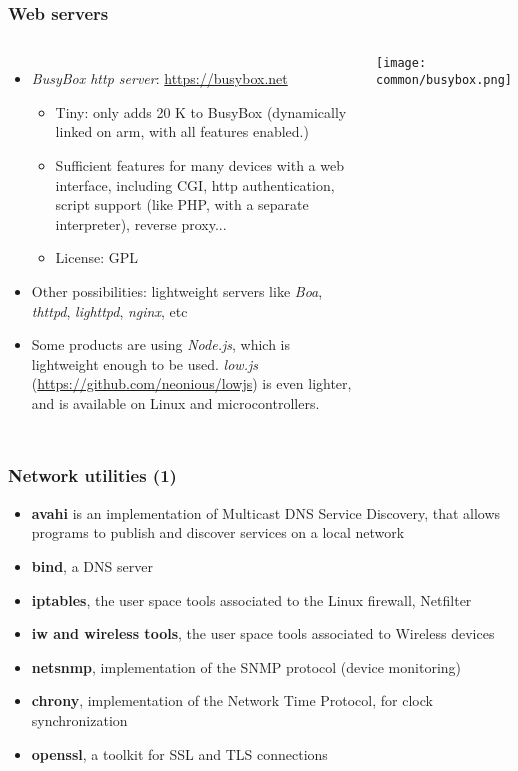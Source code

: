 \begin{frame}
  \frametitle{Web servers}
  \begin{columns}
    \begin{itemize}
    \item {\em BusyBox http server}: \url{https://busybox.net}
      \begin{itemize}
      \item Tiny: only adds 20 K to BusyBox (dynamically linked
        on arm, with all features enabled.)
      \item Sufficient features for many devices with a web interface,
        including CGI, http authentication, script support (like
        PHP, with a separate interpreter), reverse proxy...
      \item License: GPL
      \end{itemize}
    \item Other possibilities: lightweight servers like {\em Boa},
          {\em thttpd}, {\em lighttpd}, {\em nginx}, etc
    \item Some products are using {\em Node.js}, which is lightweight
          enough to be used. {\em low.js} (\url{https://github.com/neonious/lowjs})
          is even lighter, and is available on Linux and microcontrollers.
    \end{itemize}
    \texttt{[image: common/busybox.png]}\\
  \end{columns}
\end{frame}

\begin{frame}
  \frametitle{Network utilities (1)}
  \begin{itemize}
  \item {\bf avahi} is an implementation of Multicast DNS Service
    Discovery, that allows programs to publish and discover services
    on a local network
  \item {\bf bind}, a DNS server
  \item {\bf iptables}, the user space tools associated to the Linux firewall, Netfilter
  \item {\bf iw and wireless tools}, the user space tools associated to Wireless devices
  \item {\bf netsnmp}, implementation of the SNMP protocol (device monitoring)
  \item {\bf chrony}, implementation of the Network Time Protocol,
    for clock synchronization
  \item {\bf openssl}, a toolkit for SSL and TLS connections
  \end{itemize}
\end{frame}

